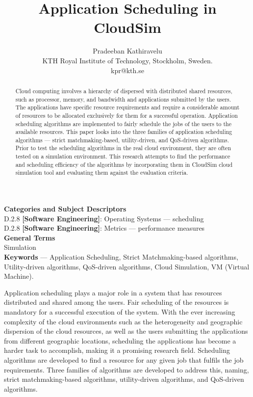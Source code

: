 \documentclass[times, 10pt,twocolumn]{article}
\begin{document}
\title{Application Scheduling in CloudSim}

\author{Pradeeban Kathiravelu\\
KTH Royal Institute of Technology, Stockholm, Sweden.\\ kpr@kth.se\\
}

\maketitle
\thispagestyle{empty}

\begin{abstract}
   Cloud computing involves a  hierarchy of dispersed with distributed shared resources, such as processor, memory, and bandwidth and applications submitted by the users. The applications have specific resource requirements and require a considerable amount of resources to be allocated exclusively for them for a successful operation. Application scheduling algorithms are implemented to fairly schedule the jobs of the users to the available resources. This paper looks into the three families of application scheduling algorithms --- strict matchmaking-based, utility-driven, and QoS-driven algorithms. Prior to test the scheduling algorithms in the real cloud environment, they are often tested on a simulation environment. This research attempts to find the performance and scheduling efficiency of the algorithms by incorporating them in CloudSim cloud simulation tool and evaluating them against the evaluation criteria. 
\end{abstract}


\textbf{Categories and Subject Descriptors}\\
D.2.8 \textbf{[Software Engineering]}: Operating Systems --- scheduling\\
D.2.8 \textbf{[Software Engineering]}: Metrics --- performance measures\\
\textbf{General Terms}\\
Simulation\\
\textbf{Keywords} ---  Application Scheduling, Strict Matchmaking-based algorithms, Utility-driven algorithms, QoS-driven algorithms, Cloud Simulation, VM (Virtual Machine).


Application scheduling plays a major role in a system that has resources distributed and shared among the users. Fair scheduling of the resources is mandatory for a successful execution of the system. With the ever increasing complexity of the cloud environments such as the heterogeneity and geographic dispersion of the cloud resources, as well as the users submitting the applications from different geographic locations, scheduling the applications has become a harder task to accomplish, making it a promising research field. Scheduling algorithms are developed to find a resource for any given job that fulfils the job requirements. Three families of algorithms are developed to address this, naming, strict matchmaking-based algorithms, utility-driven algorithms, and QoS-driven algorithms.
\end{document}
